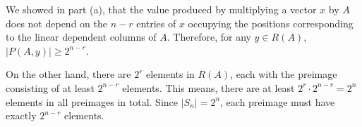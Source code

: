 We showed in part (a), that the value produced by multiplying a vector $x$ by $A$ does not depend on the $n-r$ entries of $x$ occupying the positions corresponding to the linear dependent columns of $A$.
Therefore, for any $y\in R(A)$, $|P(A,y)|\ge2^{n-r}$.

On the other hand, there are $2^r$ elements in $R(A)$, each with the preimage consisting of at least $2^{n-r}$ elements.
This means, there are at least $2^r\cdot2^{n-r}=2^n$ elements in all preimages in total.
Since $|S_n|=2^n$, each preimage must have exactly $2^{n-r}$ elements.
